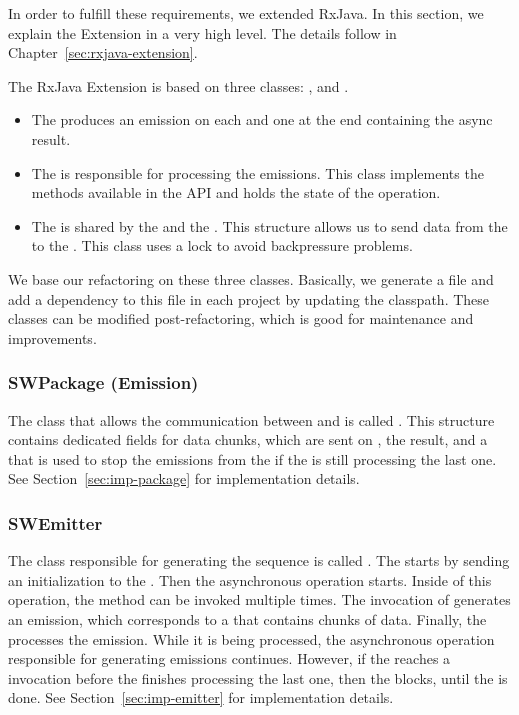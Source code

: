 \documentclass[type=bsc,accentcolor=tud9c]{tudthesis}
\begin{document}
In order to fulfill these requirements, we extended RxJava. In this section, we explain the Extension in a very high level. The details follow in Chapter~\ref{sec:rxjava-extension}. 

The RxJava Extension is based on three classes: ,  and . 
\begin{itemize}
	\item The  produces an emission on each  and one at the end containing the async result.
	\item The  is responsible for processing the emissions. This class implements the methods available in the  API and holds the state of the operation.
	\item The  is shared by the  and the . This structure allows us to send data from the  to the . This class uses a lock to avoid backpressure problems.
\end{itemize}

We base our refactoring on these three classes. Basically, we generate a  file and add a dependency to this file in each project by updating the classpath. These classes can be modified post-refactoring, which is good for maintenance and improvements.

\subsubsection{SWPackage (Emission)}
The class that allows the communication between  and  is called . This structure contains dedicated fields for data chunks, which are sent on , the result, and a  that is used to stop the emissions from the  if the  is still processing the last one. See Section~\ref{sec:imp-package} for implementation details.

\subsubsection{SWEmitter}
The class responsible for generating the sequence is called . The  starts by sending an initialization  to the . Then the asynchronous operation starts. Inside of this operation, the method  can be invoked multiple times. The invocation of  generates an emission, which corresponds to a  that contains chunks of data. Finally, the  processes the emission. While it is being processed, the asynchronous operation responsible for generating emissions continues. However, if the  reaches a  invocation before the  finishes processing the last one, then the  blocks, until the  is done. See Section~\ref{sec:imp-emitter}  for implementation details.
\end{document}
